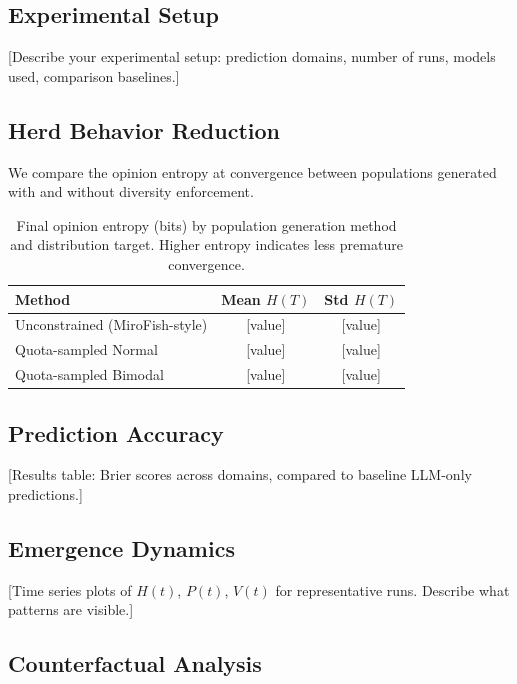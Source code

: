 \documentclass[10pt,twocolumn]{article}
\begin{document}
\subsection{Experimental Setup}

[Describe your experimental setup: prediction domains, number of runs, models used, comparison baselines.]

\subsection{Herd Behavior Reduction}

We compare the opinion entropy at convergence between populations generated with and without diversity enforcement.

\begin{table}[h]
  \centering
  \caption{Final opinion entropy (bits) by population generation method and distribution target. Higher entropy indicates less premature convergence.}
  \begin{tabular}{lcc}
    \toprule
    Method & Mean $H(T)$ & Std $H(T)$ \\
    \midrule
    Unconstrained (MiroFish-style) & [value] & [value] \\
    Quota-sampled Normal & [value] & [value] \\
    Quota-sampled Bimodal & [value] & [value] \\
    \bottomrule
  \end{tabular}
  \label{tab:entropy}
\end{table}

\subsection{Prediction Accuracy}

[Results table: Brier scores across domains, compared to baseline LLM-only predictions.]

\subsection{Emergence Dynamics}

[Time series plots of $H(t)$, $P(t)$, $V(t)$ for representative runs. Describe what patterns are visible.]

\subsection{Counterfactual Analysis}
\end{document}

